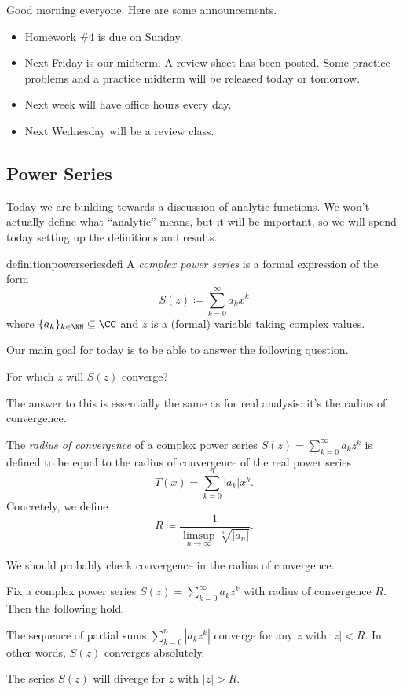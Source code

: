 
Good morning everyone. Here are some announcements.
\begin{itemize}
	\item Homework \#4 is due on Sunday.
	\item Next Friday is our midterm. A review sheet has been posted. Some practice problems and a practice midterm will be released today or tomorrow.
	\item Next week will have office hours every day.
	\item Next Wednesday will be a review class.
\end{itemize}

\subsection{Power Series}
Today we are building towards a discussion of analytic functions. We won't actually define what ``analytic'' means, but it will be important, so we will spend today setting up the definitions and results.
\begin{restatable}{definition}{powerseriesdefi}
	A \textit{complex power series} is a formal expression of the form
	\[S(z)\coloneqq \sum_{k=0}^\infty a_kx^k\]
	where $\{a_k\}_{k\in\NN}\subseteq\CC$ and $z$ is a (formal) variable taking complex values.
\end{restatable}
Our main goal for today is to be able to answer the following question.
\begin{ques}
	For which $z$ will $S(z)$ converge?
\end{ques}
The answer to this is essentially the same as for real analysis: it's the radius of convergence.
\begin{definition}
	The \textit{radius of convergence} of a complex power series $S(z)=\sum_{k=0}^\infty a_kz^k$ is defined to be equal to the radius of convergence of the real power series
	\[T(x)=\sum_{k=0}^n|a_k|x^k.\]
	Concretely, we define
	\[R\coloneqq \frac1{\limsup_{n\to\infty}\sqrt[n]{|a_n|}}.\]
\end{definition}
We should probably check convergence in the radius of convergence.
\begin{prop} \label{prop:radconverge}
	Fix a complex power series $S(z)=\sum_{k=0}^\infty a_kz^k$ with radius of convergence $R$. Then the following hold.
	\begin{listalph}
		\item The sequence of partial sums $\sum_{k=0}^n\left|a_kz^k\right|$ converge for any $z$ with $|z|<R$. In other words, $S(z)$ converges absolutely.
		\item The series $S(z)$ will diverge for $z$ with $|z|>R$.
	\end{listalph}
\end{prop}
